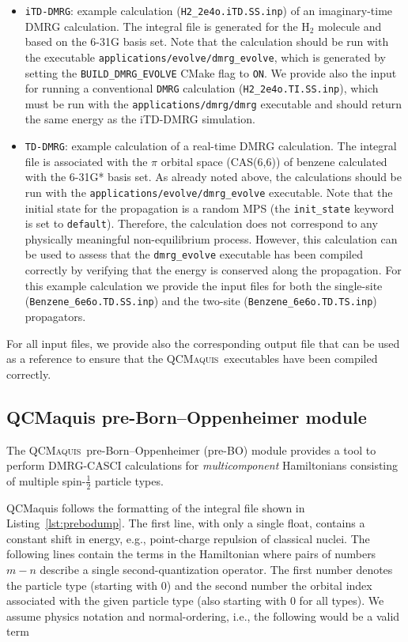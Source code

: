 \documentclass[bibliography=totoc,12pt,a4paper]{scrartcl}
\newcommand{\qcm}{\textsc{QCMaquis}}
\begin{document}
\begin{itemize}
 \item \texttt{iTD-DMRG}: example calculation (\texttt{H2\_2e4o.iTD.SS.inp}) of an imaginary-time DMRG calculation. The integral file is generated for the H$_2$ molecule and based on the 6-31G basis set.
 Note that the calculation should be run with the executable \texttt{applications/evolve/dmrg\_evolve}, which is generated by setting the \texttt{BUILD\_DMRG\_EVOLVE} CMake flag to \texttt{ON}.
 We provide also the input for running a conventional \texttt{DMRG} calculation (\texttt{H2\_2e4o.TI.SS.inp}), which must be run with the \texttt{applications/dmrg/dmrg} executable and should return the same energy as the iTD-DMRG simulation.
 \item \texttt{TD-DMRG}: example calculation of a real-time DMRG calculation. The integral file is associated with the $\pi$ orbital space (CAS(6,6)) of benzene calculated with the 6-31G* basis set. As already noted above, the calculations should be run with the \texttt{applications/evolve/dmrg\_evolve} executable.
 Note that the initial state for the propagation is a random MPS (the \texttt{init\_state} keyword is set to \texttt{default}).
 Therefore, the calculation does not correspond to any physically meaningful non-equilibrium process. 
 However, this calculation can be used to assess that the \texttt{dmrg\_evolve} executable has been compiled correctly by verifying that the energy is conserved along the propagation.
 For this example calculation we provide the input files for both the single-site (\texttt{Benzene\_6e6o.TD.SS.inp}) and the two-site (\texttt{Benzene\_6e6o.TD.TS.inp}) propagators.
\end{itemize}

For all input files, we provide also the corresponding output file that can be used as a reference to ensure that the \qcm\ executables have been compiled correctly.


\subsection{QCMaquis pre-Born--Oppenheimer module}\label{sec:preBO}

The \qcm\ pre-Born--Oppenheimer (pre-BO) module provides a tool to perform DMRG-CASCI calculations for \textit{multicomponent} Hamiltonians consisting of multiple spin-$\frac12$ particle types.

QCMaquis follows the formatting of the integral file shown in Listing~\ref{lst:prebodump}.
The first line, with only a single float, contains a constant shift in energy, e.g., point-charge repulsion of classical nuclei.
The following lines contain the terms in the Hamiltonian where pairs of numbers $m-n$ describe a single second-quantization operator.
The first number denotes the particle type (starting with 0) and the second number the orbital index associated with the given particle type (also starting with 0 for all types).
We assume physics notation and normal-ordering, i.e., the following would be a valid term
\end{document}
